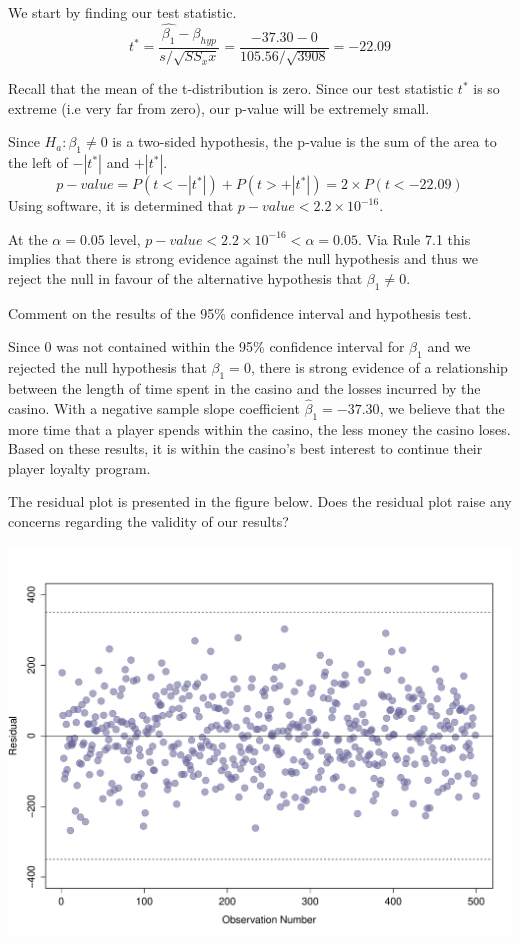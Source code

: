 \begin{example}
\begin{benumerate}
We start by finding our test statistic.
\[ t^{*} = \frac{\hat{\beta_1} - \beta_{hyp}}{s/\sqrt{SS_xx}} = \frac{-37.30 - 0}{105.56/\sqrt{3908}} = -22.09\]

Recall that the mean of the t-distribution is zero. Since our test statistic $t^{*}$ is so extreme (i.e very far from zero), our p-value will be extremely small.

Since $H_a: \beta_1 \neq 0$ is a two-sided hypothesis, the p-value is the sum of the area to the left of $-|t^{*}|$ and $+|t^{*}|$.
\[ p-value = P(t<-|t^{*}|) + P(t > +|t^{*}|) = 2 \times P(t < -22.09) \]
Using software, it is determined that $p-value < 2.2 \times 10^{-16}$. 

At the $\alpha=0.05$ level, $p-value < 2.2 \times 10^{-16} < \alpha = 0.05$. Via Rule 7.1 this implies that there is strong evidence against the null hypothesis and thus we reject the null in favour of the alternative hypothesis that $\beta_1 \neq 0$.

\item Comment on the results of the 95\% confidence interval and hypothesis test. 

Since 0 was not contained within the 95\% confidence interval for $\beta_1$ and we rejected the null hypothesis that $\beta_1=0$, there is strong evidence of a relationship between the length of time spent in the casino and the losses incurred by the casino. With a negative sample slope coefficient $\hat{\beta}_1 = -37.30$, we believe that the more time that a player spends within the casino, the less money the casino loses. Based on these results, it is within the casino's best interest to continue their player loyalty program.

\item The residual plot is presented in the figure below. Does the residual plot raise any concerns regarding the validity of our results?

\begin{center}
\includegraphics[scale=0.5]{Section8/casinoresidual.pdf}
\end{center}


\end{benumerate}
\end{example}
